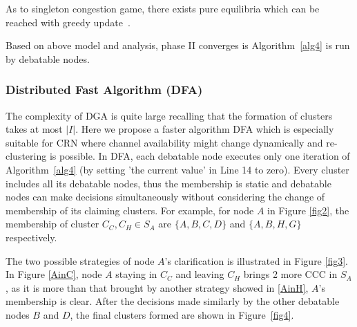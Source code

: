 As to singleton congestion game, there exists pure equilibria which can be reached with greedy update~\cite{Ackermann06purenash}.


Based on above model and analysis, phase II converges is Algorithm~\ref{alg4} is run by debatable nodes. 

\subsubsection*{Distributed Fast Algorithm (DFA)}
The complexity of DGA is quite large recalling that the formation of clusters takes at most $|I|$. Here we propose a faster algorithm DFA which is especially suitable for CRN where channel availability might change dynamically and re-clustering is possible. %
In DFA, each debatable node executes only one iteration of Algorithm~\ref{alg4} (by setting 'the current value' in Line 14 to zero). Every cluster includes all its debatable nodes, thus the membership is static and debatable nodes can make decisions simultaneously without considering the change of membership of its claiming clusters. For example, for node $A$ in Figure \ref{fig2}, the membership of cluster $C_C, C_H\in S_A$ are $\{A,B,C,D\}$ and $\{A,B,H,G\}$ respectively. 

The two possible strategies of node $A$'s clarification is illustrated in Figure \ref{fig3}. In Figure \ref{AinC}, node $A$ staying in $C_C$ and leaving $C_H$ brings 2 more CCC in $S_A$, as it is more than that brought by another strategy showed in \ref{AinH}, $A$'s membership is clear. After the decisions made similarly by the other debatable nodes $B$ and $D$, the final clusters formed are shown in Figure~\ref{fig4}.

